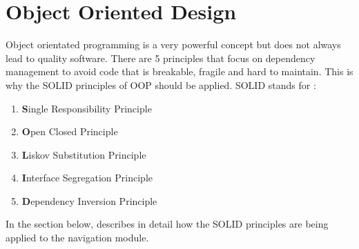 \section{Object Oriented Design}
    Object orientated programming is a very powerful concept but does not always lead to quality
    software. There are 5 principles that focus on dependency management to avoid code that
    is breakable, fragile and hard to maintain. This is why the SOLID \cite{Hotop2015} 
    principles of OOP should be applied.
    SOLID stands for :
    \begin{enumerate}
        \item 
            \textbf{S}ingle Responsibility Principle
        \item 
            \textbf{O}pen Closed Principle
        \item 
            \textbf{L}iskov Substitution Principle
        \item 
            \textbf{I}nterface Segregation Principle
        \item 
            \textbf{D}ependency Inversion Principle
    \end{enumerate}
    In the section below, describes in detail how the SOLID principles are 
    being applied to the navigation module. 

    
    
    